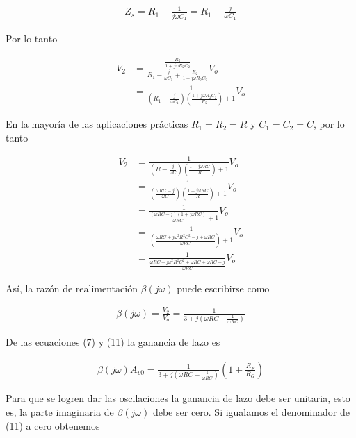 \documentclass{article}
\begin{document}
\begin{align}
	Z_s = R_1 + \frac{1}{j \omega C_1} = R_1 - \frac{j}{\omega C_1}
\end{align}

Por lo tanto

\begin{align}
	V_2  &= \frac{ \frac{R_2}{1 + j \omega R_2 C_2} }{ R_1 - \frac{j}{\omega C_1} + \frac{R_2}{1 + j \omega R_2 C_2} }V_o \nonumber \\
	&= \frac{1}{ \left( R_1 - \frac{j}{\omega C_1} \right) \left( \frac{1 + j \omega R_2C_2}{R_2} \right)  + 1}V_o \nonumber
\end{align}

En la mayoría de las aplicaciones prácticas $R_1 = R_2 = R$ y $C_1 = C_2 = C$, por lo tanto

\begin{align}
	V_2 &= \frac{1}{ \left( R - \frac{j}{\omega C} \right) \left( \frac{1 + j \omega RC}{R} \right) + 1 }V_o \nonumber \\
        &= \frac{1}{ \left( \frac{\omega RC - j}{\omega C} \right) \left( \frac{1 + j\omega RC}{R}  \right) +1 }V_o \nonumber\\
        &= \frac{1}{ \frac{ (\omega RC - j)(1 + j\omega RC) }{\omega RC} +1 }V_o \nonumber \\
        &= \frac{1}{ \left( \frac{ \omega RC + j\omega^2 R^2C^2 - j + \omega RC }{\omega RC} \right) + 1 }V_o \nonumber \\
        &= \frac{1}{ \frac{ \omega RC + j \omega^2 R^2C^2 + \omega RC + \omega RC - j }{\omega RC} }V_o \nonumber
\end{align}

Así, la razón de realimentación $\beta (j\omega)$ puede escribirse como

\begin{align}
	\beta (j \omega) = \frac{V_2}{V_o} = \frac{1}{3 + j\left( \omega RC - \frac{1}{\omega RC} \right)}
\end{align}

De las ecuaciones (7) y (11) la ganancia de lazo es

\begin{align}
	\beta (j \omega) A_{v0} = \frac{1}{3 + j \left( \omega RC - \frac{1}{\omega RC} \right)} \left( 1 +  \frac{R_F}{R_G} \right)
\end{align}

Para que se logren dar las oscilaciones la ganancia de lazo debe ser unitaria, esto es, la parte imaginaria de $\beta (j \omega)$ debe ser cero. Si igualamos el denominador de (11) a cero obtenemos
\end{document}
